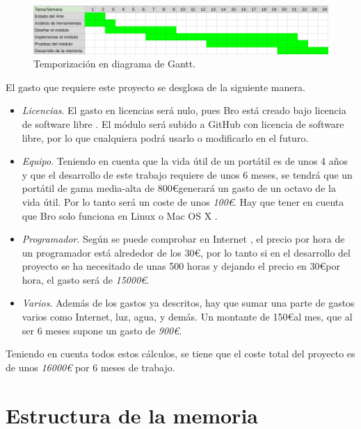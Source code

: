 \begin{figure}[H]
  \includegraphics[width=1\textwidth]{imagenes/temporizacion.png} 
  \centering
  \caption{Temporización en diagrama de Gantt.}\label{fig.tempo}
\end{figure}

El gasto que requiere este proyecto se desglosa de la siguiente manera.
\begin{itemize}
\item \textit{Licencias}. El gasto en licencias será nulo, pues Bro está creado bajo licencia de software libre \cite{broindex}. El 
módulo será subido a GitHub \cite{repo} con licencia de software libre, por lo que cualquiera podrá usarlo o modificarlo en el futuro.
\item \textit{Equipo}. Teniendo en cuenta que la vida útil de un portátil es de unos 4 años y que el desarrollo de este trabajo 
requiere de unos 6 meses, se tendrá que un portátil de gama media-alta de 800\euro generará un gasto de un octavo de la vida útil. Por 
lo tanto será un coste de unos \textit{100\euro}. Hay que tener en cuenta que Bro solo funciona en Linux o Mac OS X 
\cite{brodownload}.
\item \textit{Programador}. Según se puede comprobar en Internet \cite{tarifa}, el precio por hora de un programador está alrededor de  
los 30\euro, por lo tanto si en el desarrollo del proyecto se ha necesitado de unas 500 horas y dejando el precio en 30\euro por hora, 
el gasto será de \textit{15000\euro}.
\item \textit{Varios}. Además de los gastos ya descritos, hay que sumar una parte de gastos varios como Internet, luz, agua, y 
demás. Un montante de 150\euro al mes, que al ser 6 meses supone un gasto de \textit{900\euro}.
\end{itemize}

\intro Teniendo en cuenta todos estos cálculos, se tiene que el coste total del proyecto es de unos \textit{16000\euro} por 6 meses de 
trabajo.

\section{Estructura de la memoria}

